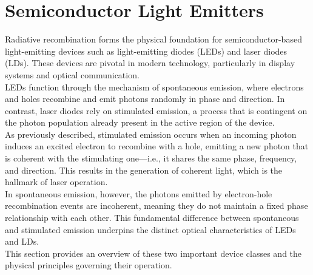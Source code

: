 \section{Semiconductor Light Emitters}
Radiative recombination forms the physical foundation for semiconductor-based light-emitting devices such as light-emitting diodes (LEDs) and laser diodes (LDs). These devices are pivotal in modern technology, particularly in display systems and optical communication.\\
LEDs function through the mechanism of spontaneous emission, where electrons and holes recombine and emit photons randomly in phase and direction. In contrast, laser diodes rely on stimulated emission, a process that is contingent on the photon population already present in the active region of the device.\\
As previously described, stimulated emission occurs when an incoming photon induces an excited electron to recombine with a hole, emitting a new photon that is coherent with the stimulating one—i.e., it shares the same phase, frequency, and direction. This results in the generation of coherent light, which is the hallmark of laser operation.\\
In spontaneous emission, however, the photons emitted by electron-hole recombination events are incoherent, meaning they do not maintain a fixed phase relationship with each other. This fundamental difference between spontaneous and stimulated emission underpins the distinct optical characteristics of LEDs and LDs.\\
This section provides an overview of these two important device classes and the physical principles governing their operation.
